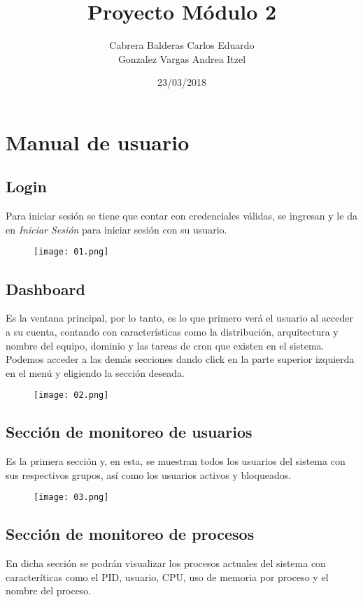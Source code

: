 \documentclass[12pt]{article}
\title{Proyecto Módulo 2}
\author{Cabrera Balderas Carlos Eduardo\\Gonzalez Vargas Andrea Itzel}
\date{23/03/2018}
\begin{document}
\maketitle
\tableofcontents

\newpage

\section{Manual de usuario}

\subsection{Login}
Para iniciar sesión se tiene que contar con credenciales válidas, se ingresan y le da en \textit{Iniciar Sesión} para iniciar sesión con su usuario.
\begin{figure}[H]
  \centering
  \texttt{[image: 01.png]}
\end{figure}

\subsection{Dashboard}
Es la ventana principal, por lo tanto, es lo que primero verá el usuario al acceder a su cuenta, contando con características como la distribución, arquitectura y nombre del equipo, dominio y las tareas de cron que existen en el sistema.\\

Podemos acceder a las demás secciones dando click en la parte superior izquierda en el menú y eligiendo la sección deseada.

\begin{figure}[H]
  \centering
  \texttt{[image: 02.png]}  
\end{figure}


\subsection{Sección de monitoreo de usuarios}
Es la primera sección y, en esta, se muestran todos los usuarios del sistema con sus respectivos grupos, así como los usuarios activos y bloqueados.  
\begin{figure}[H]
  \centering
  \texttt{[image: 03.png]}  
\end{figure}

\subsection{Sección de monitoreo de procesos}
En dicha sección se podrán visualizar los procesos actuales del sistema con caracteríticas como el PID, usuario, CPU, uso de memoria por proceso y el nombre del proceso.\\
\end{document}
